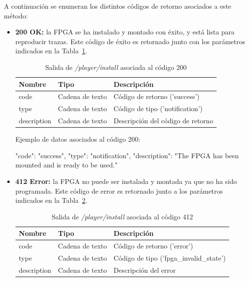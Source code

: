 A continuación se enumeran los distintos códigos de retorno asociados a este método:
\begin{itemize}

\item{\textbf{200 OK:} la \gls{FPGA} se ha instalado y montado con éxito, y está lista para reproducir \glspl{traza}.
Este código de éxito es retornado junto con los parámetros indicados en la Tabla~\ref{extra:api:playerinstall:ok}.
\begin{table}[H]
\centering
\begin{tabular}{|l|l|l|}
\hline
\rowcolor[HTML]{F5F5F5}
\textbf{Nombre}  & \textbf{Tipo}   & \textbf{Descripción}              \\ \hline
code             & Cadena de texto & Código de retorno ('success')     \\ \hline
type             & Cadena de texto & Código de tipo ('notification')   \\ \hline
description      & Cadena de texto & Descripción del código de retorno \\ \hline
\end{tabular}
\caption{Salida de \textit{/player/install} asociada al código 200}
\label{extra:api:playerinstall:ok}
\end{table}
\begin{minipage}{\textwidth}
Ejemplo de datos asociados al código 200:

\begin{code}[language=json]
{
  "code": "success",
  "type": "notification",
  "description": "The FPGA has been mounted and is ready to be used."
}
\end{code}
\end{minipage}
}

\item{\textbf{412 Error:} la \gls{FPGA} no puede ser instalada y montada ya que no ha sido programada.
Este código de error es retornado junto a los parámetros indicados en la Tabla~\ref{extra:api:playerinstall:error}.
\begin{table}[H]
\centering
\begin{tabular}{|l|l|l|}
\hline
\rowcolor[HTML]{F5F5F5}
\textbf{Nombre}  & \textbf{Tipo}   & \textbf{Descripción}                    \\ \hline
code             & Cadena de texto & Código de retorno ('error')             \\ \hline
type             & Cadena de texto & Código de tipo ('fpga\_invalid\_state') \\ \hline
description      & Cadena de texto & Descripción del error                   \\ \hline
\end{tabular}
\caption{Salida de \textit{/player/install} asociada al código 412}
\label{extra:api:playerinstall:error}
\end{table}

}
\end{itemize}
